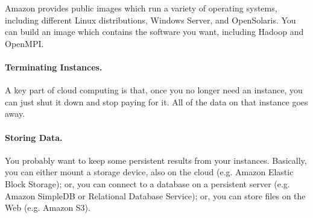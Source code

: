 \documentclass[11pt]{article}
\begin{document}
Amazon provides public images which run a variety of operating
systems, including different Linux distributions, Windows Server, and
OpenSolaris. You can build an image which contains the software you
want, including Hadoop and OpenMPI.

\paragraph{Terminating Instances.} A key part of cloud computing is
that, once you no longer need an instance, you can just shut it down
and stop paying for it. All of the data on that instance goes away.

\paragraph{Storing Data.} You probably want to keep some persistent results
from your instances. Basically, you can either mount a storage device,
also on the cloud (e.g. Amazon Elastic Block Storage); or, you can
connect to a database on a persistent server (e.g. Amazon SimpleDB or
Relational Database Service); or, you can store files on the Web
(e.g. Amazon S3). 
\end{document}
